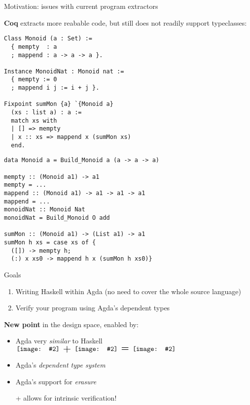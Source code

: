 \documentclass[aspectratio=169]{beamer}
\renewcommand\alert[1]{\textcolor{mLightBrown}{#1}}
\newcommand\img[2]{\texttt{[image: \#2]}}
\newcommand\smallImg[1]{\img{1.7em}{#1}}
\newcommand*\vmid[1]{\vcenter{\hbox{#1}}}
\newcommand\agdaHsLove{%
$
\vmid{\smallImg{agda}}
\vmid{\scalebox{1.5}{\ +\ }}
\vmid{\smallImg{haskell}}
\vmid{\scalebox{1.5}{\ =\ }}
\vmid{\smallImg{heart}}
$
}
\begin{document}
\begin{frame}[fragile]{Motivation: issues with current program extractors}

\textbf{Coq} extracts more reabable code, but still does not readily support typeclasses:

\begin{alertblock}{}
\begin{minipage}{.43\textwidth}%
\begin{verbatim}
Class Monoid (a : Set) :=
  { mempty  : a
  ; mappend : a -> a -> a }.

Instance MonoidNat : Monoid nat :=
  { mempty := 0
  ; mappend i j := i + j }.

Fixpoint sumMon {a} `{Monoid a}
  (xs : list a) : a :=
  match xs with
  | [] => mempty
  | x :: xs => mappend x (sumMon xs)
  end.
\end{verbatim}
\end{minipage}
\vrule\hspace{.1cm}
\begin{minipage}{.5\textwidth}%
\begin{verbatim}
data Monoid a = Build_Monoid a (a -> a -> a)

mempty :: (Monoid a1) -> a1
mempty = ...
mappend :: (Monoid a1) -> a1 -> a1 -> a1
mappend = ...
monoidNat :: Monoid Nat
monoidNat = Build_Monoid O add

sumMon :: (Monoid a1) -> (List a1) -> a1
sumMon h xs = case xs of {
  ([]) -> mempty h;
  (:) x xs0 -> mappend h x (sumMon h xs0)}
\end{verbatim}
\end{minipage}
\end{alertblock}

\end{frame}

\begin{frame}[fragile]{Goals}
\begin{enumerate}
\item Writing Haskell within Agda (no need to cover the whole source language)
\item Verify your program using Agda's dependent types
\end{enumerate}
\pause
\textbf{New point} in the design space, enabled by:
\begin{itemize}
\item Agda very \textit{similar} to Haskell \hspace{.5cm}\agdaHsLove{}
\item Agda's \textit{dependent type system}
\item Agda's support for \textit{erasure}
\item[+] allows for \alert{intrinsic verification}!
\end{itemize}

\end{frame}
\end{document}
